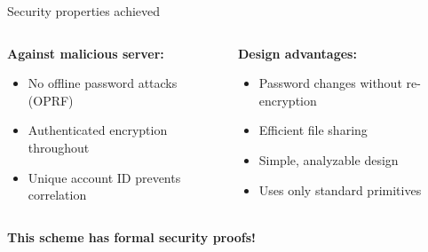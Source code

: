 \documentclass[aspectratio=169, lualatex, handout]{beamer}
\begin{document}
\begin{frame}{Security properties achieved}
	\begin{columns}[c]
		\begin{column}{0.5\textwidth}
			\textbf{Against malicious server:}
			\begin{itemize}
				\item[\textcolor{green}{\mycheckmark}] No offline password attacks (OPRF)
				\item[\textcolor{green}{\mycheckmark}] Authenticated encryption throughout
				\item[\textcolor{green}{\mycheckmark}] Unique account ID prevents correlation
			\end{itemize}
		\end{column}
		\begin{column}{0.5\textwidth}
			\textbf{Design advantages:}
			\begin{itemize}
				\item[\textcolor{green}{\mycheckmark}] Password changes without re-encryption
				\item[\textcolor{green}{\mycheckmark}] Efficient file sharing
				\item[\textcolor{green}{\mycheckmark}] Simple, analyzable design
				\item[\textcolor{green}{\mycheckmark}] Uses only standard primitives
			\end{itemize}
		\end{column}
	\end{columns}
	\vspace{0.5cm}
	\begin{center}
		\textbf{This scheme has formal security proofs!}
	\end{center}
\end{frame}
\end{document}
